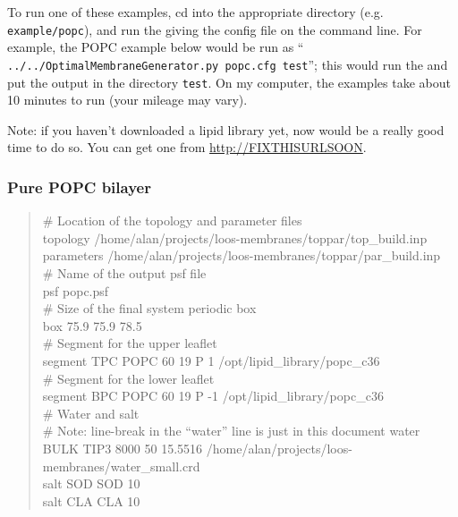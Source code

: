 \documentclass[12pt]{article}
\begin{document}
To run one of these examples, cd into the appropriate directory (e.g. {\tt
example/popc}), and run the {\omgwtf} giving the config file on the command
line.  For example, the POPC example below would be run as ``{\tt
../../OptimalMembraneGenerator.py popc.cfg test}''; this would run the
{\omgwtf} and put the output in the directory {\tt test}.  On my computer,
the examples take about 10 minutes to run (your mileage may vary).

Note: if you haven't downloaded a lipid library yet, now would be a really
good time to do so.  You can get one from \url{http://FIXTHISURLSOON}.
 


\subsubsection{Pure POPC bilayer}

\begin{quote}
\# Location of the topology and parameter files \\
topology /home/alan/projects/loos-membranes/toppar/top\_build.inp \\
parameters /home/alan/projects/loos-membranes/toppar/par\_build.inp \\

\# Name of the output psf file \\
psf      popc.psf \\

\# Size of the final system periodic box \\
box      75.9  75.9  78.5 \\

\# Segment for the upper leaflet \\
segment TPC       POPC     60    19    P 1      /opt/lipid\_library/popc\_c36
\\
\# Segment for the lower leaflet \\
segment BPC       POPC     60    19    P -1     /opt/lipid\_library/popc\_c36
\\

\# Water and salt \\
\# Note: line-break in the ``water'' line is just in this document
water   BULK     TIP3      8000       50      15.5516 /home/alan/projects/loos-membranes/water\_small.crd \\
salt    SOD       SOD      10 \\
salt    CLA       CLA      10 \\
\end{quote}
\end{document}

